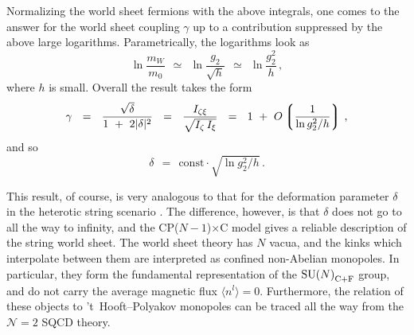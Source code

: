 \documentclass[12pt]{article}
\newcommand{\ntwo}{${\mathcal N}=2$ }
\newcommand{\lgr}{\left\lgroup}
\newcommand{\rgr}{\right\rgroup}
\def\cfl {$\text{SU($N$)}_{\rm C+F}$ }
\newcommand{\CPC}{CP($N-1$)$\times$C }
\begin{document}
Normalizing the world sheet fermions with the above integrals, one comes to the answer
for the world sheet coupling $ \gamma $ up to a contribution suppressed by the above large logarithms.
Parametrically, the logarithms look as
\[
	\ln \frac{m_W}{m_0}  ~~\simeq~~ 
			\ln \frac{g_2}{\sqrt{h}} ~~\simeq~~ \ln \frac{g_2^2}{h}\,,
\]
where $ h $ is small.
Overall the result takes the form
\[
	\gamma ~~=~~ \frac{\sqrt{\delta}}{1 ~+~ 2|\delta|^2} ~~=~~ 
		\frac{I_{\zeta\xi}}{\sqrt{I_\zeta\, I_\xi}}  ~~=~~
			1 ~+~ O\lgr \frac{1}{\ln g_2^2/h } \rgr\,,
\]
and so
\[
	\delta ~~=~~ \text{const}\cdot \sqrt{\ln g_2^2/h}\,.
\]

This result, of course, is very analogous to that for the deformation parameter $ \delta $ 
in the heterotic string scenario \cite{SYhet,BSYhet}. 
The difference, however, is that $ \delta $ does not go to all the way to infinity, and the \CPC model 
gives a reliable description of the string world sheet. 
The world sheet theory has $ N $ vacua, and the kinks which interpolate between them are interpreted
as confined non-Abelian monopoles.
In particular, they form the fundamental representation of the \cfl group, and do not carry
the average magnetic flux $ \langle n^l \rangle = 0 $.
Furthermore, the relation of these objects to 't~Hooft--Polyakov monopoles can be traced all the way from
the \ntwo SQCD theory. 
\end{document}
